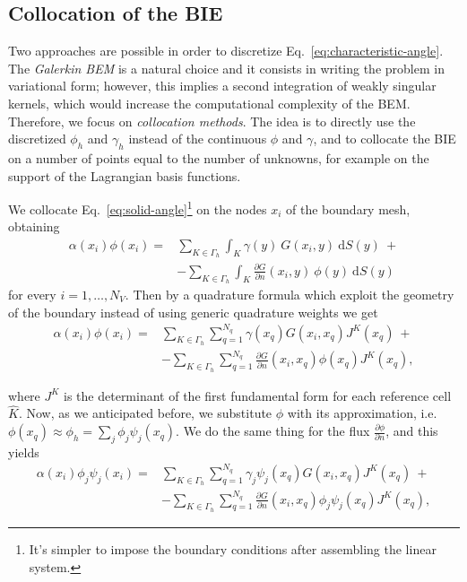 \subsection{Collocation of the BIE}
\label{sub:collocation_of_the_bie}

Two approaches are possible in order to discretize Eq.~\eqref{eq:characteristic-angle}. The \emph{Galerkin BEM} is a natural choice and it consists in writing the problem in variational form; however, this implies a second integration of weakly singular kernels, which would increase the computational complexity of the BEM. Therefore, we focus on \emph{collocation methods}. The idea is to directly use the discretized $\phi_h$ and $\gamma_h$ instead of the continuous $\phi$ and $\gamma$, and to collocate the BIE on a number of points equal to the number of unknowns, for example on the support of the Lagrangian basis functions.

We collocate Eq.~\eqref{eq:solid-angle}\footnote{It's simpler to impose the boundary conditions after assembling the linear system.} on the nodes $x_i$ of the boundary mesh, obtaining
\begin{align*}
\alpha(x_i)\phi(x_i)=&\sum_{K\in\Gamma_h}\int_K \gamma(y)\ G(x_i,y)\ \mathrm{d}S(y)\ + \\
& - \sum_{K\in\Gamma_h}\int_K \frac{\partial G}{\partial n}(x_i,y)\ \phi(y)\ \mathrm{d}S(y)
\end{align*}
for every $i=1,\dots,N_V$. Then by a quadrature formula which exploit the geometry of the boundary instead of using generic quadrature weights we get
\begin{align*}
\alpha(x_i)\phi(x_i)=&\sum_{K\in\Gamma_h}\sum_{q=1}^{N_q} \gamma(x_q) G(x_i,x_q) J^K(x_q)\ + \\
& - \sum_{K\in\Gamma_h}\sum_{q=1}^{N_q} \frac{\partial G}{\partial n}(x_i,x_q) \phi(x_q) J^K(x_q),
\end{align*}

where $J^K$ is the determinant of the first fundamental form for each reference cell $\hat{K}$. Now, as we anticipated before, we substitute $\phi$ with its approximation, i.e. $\phi(x_q)\approx \phi_h= \sum_j \phi_j \psi_j(x_q)$. We do the same thing for the flux $\frac{\partial\phi}{\partial n}$, and this yields
\begin{align*}
\alpha(x_i)\phi_j\psi_j(x_i)=&\sum_{K\in\Gamma_h}\sum_{q=1}^{N_q} \gamma_j \psi_j(x_q) G(x_i,x_q) J^K(x_q)\ + \\
& - \sum_{K\in\Gamma_h}\sum_{q=1}^{N_q} \frac{\partial G}{\partial n}(x_i,x_q) \phi_j \psi_j(x_q) J^K(x_q),
\end{align*}

